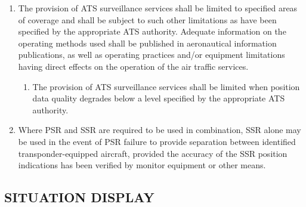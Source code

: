 \documentclass[../vATM.tex]{subfiles}
\begin{document}
\begin{enumerate}[label=\arabic{section}.\arabic{subsection}.\arabic*]
        \item The provision of ATS surveillance services shall be limited to specified areas of coverage and shall be subject to such other limitations as have been specified by the appropriate ATS authority. Adequate information on the operating methods used shall be published in aeronautical information publications, as well as operating practices and/or equipment limitations having direct effects on the operation of the air traffic services.

        \begin{enumerate}[label=\arabic{section}.\arabic{subsection}.\arabic{enumi}.\arabic*]
            \item The provision of ATS surveillance services shall be limited when position data quality degrades below a level specified by the appropriate ATS authority.
        \end{enumerate}

        \item Where PSR and SSR are required to be used in combination, SSR alone may be used in the event of PSR failure to provide separation between identified transponder-equipped aircraft, provided the accuracy of the SSR position indications has been verified by monitor equipment or other means.
    \end{enumerate}

    \subsection[Situation display]{SITUATION DISPLAY}
\end{document}
